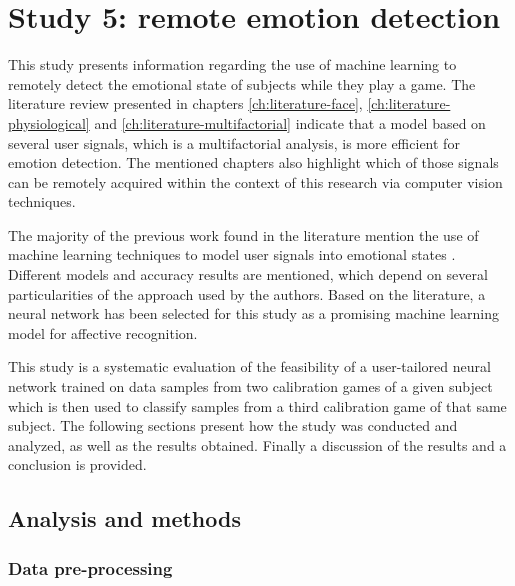 \section{Study 5: remote emotion detection}
\label{s:experiment1-study5}

This study presents information regarding the use of machine learning to remotely detect the emotional state of subjects while they play a game. The literature review presented in chapters \ref{ch:literature-face}, \ref{ch:literature-physiological} and \ref{ch:literature-multifactorial} indicate that a model based on several user signals, which is a multifactorial analysis, is more efficient for emotion detection. The mentioned chapters also highlight which of those signals can be remotely acquired within the context of this research via computer vision techniques.

The majority of the previous work found in the literature mention the use of machine learning techniques to model user signals into emotional states \parencite{moghimi2017affective}. Different models and accuracy results are mentioned, which depend on several particularities of the approach used by the authors. Based on the literature, a neural network has been selected for this study as a promising machine learning model for affective recognition.

This study is a systematic evaluation of the feasibility of a user-tailored neural network trained on data samples from two calibration games of a given subject which is then used to classify samples from a third calibration game of that same subject. The following sections present how the study was conducted and analyzed, as well as the results obtained. Finally a discussion of the results and a conclusion is provided.

\subsection{Analysis and methods}
\label{s:experiment1-study5-method}

\subsubsection{Data pre-processing}

